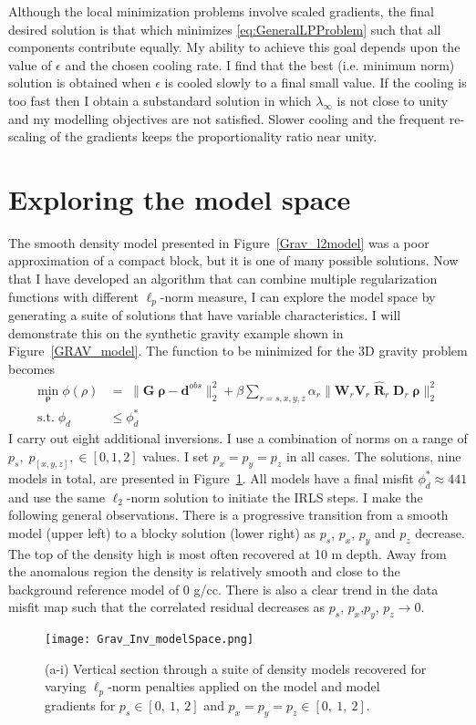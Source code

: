 Although the local minimization problems involve scaled gradients, the final desired solution is that which minimizes \eqref{eq:GeneralLPProblem} such that all components contribute equally. My ability to achieve this goal depends upon the value of $\epsilon$ and the chosen cooling rate. I find that the best (i.e. minimum norm) solution is obtained when $\epsilon$ is cooled slowly to a final small value. If the cooling is too fast then I obtain a substandard solution in which $\lambda_\infty$ is not close to unity and my modelling objectives are not satisfied. Slower cooling and the frequent re-scaling of the gradients keeps the proportionality ratio near unity.

\section{Exploring the model space}

The smooth density model presented in Figure~\ref{Grav_l2model} was a poor approximation of a compact block, but it is one of many possible solutions.
Now that I have developed an algorithm that can combine multiple regularization functions with different $\ell_p$-norm measure, I can explore the model space by generating a suite of solutions that have variable characteristics.
I will demonstrate this on the synthetic gravity example shown in Figure~\ref{GRAV_model}. The function to be minimized for the 3D gravity problem becomes
\begin{equation}\label{ObjFun3D}
\begin{split}
\underset{\boldsymbol{\rho}}{\text{min}}\; \phi(\rho) & = \; \|\mathbf{G}\;\boldsymbol{\rho} - \mathbf{d}^{obs}\|_2^2 + \beta \sum_{r=s,x,y,z} \alpha_r \|\mathbf{W}_r \mathbf{V}_r \;\mathbf{\hat R}_r\;\mathbf{D}_r \;\boldsymbol{\rho}\|_2^2 \\
\text{s.t.} \; \phi_d & \leq \phi_d^* \;
\end{split}
\end{equation}
I carry out eight additional inversions. I use a combination of norms on a range of $p_s,\; p_{[x,y,z]}, \in {[0,1,2]}$ values. I set $p_x=p_y=p_z$ in all cases. The solutions, nine models in total, are presented in Figure~\ref{GravMixedNorms}. All models have a final misfit $\phi_d^* \approx 441$ and use the same $\ell_2$-norm solution to initiate the IRLS steps.
I make the following general observations.
There is a progressive transition from a smooth model (upper left) to a blocky solution (lower right) as $p_s$, $p_{x}$, $p_y$ and $p_z$ decrease. The top of the density high is most often recovered at 10 m depth. Away from the anomalous region the density is relatively smooth and close to the background reference model of 0 g/cc. There is also a clear trend in the data misfit map such that the correlated residual decreases as $p_s$, $p_{x}$,$p_{y}$, $p_{z}\rightarrow 0$.
\begin{figure}
\texttt{[image: Grav\_Inv\_modelSpace.png]}
\caption{(a-i) Vertical section through a suite of density models recovered for varying $\ell_p$-norm penalties applied on the model and model gradients for $p_s\in[0,\:1,\: 2]$ and $p_{x}=p_{y}=p_{z}\in[0,\:1,\: 2]$.
}
\label{GravMixedNorms}
\end{figure}

